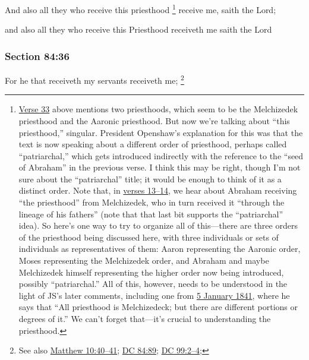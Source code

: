 		And also all they who receive this priesthood%
			\footnote{%
				\hyperref[DC84-33]{Verse 33} above mentions two priesthoods, which seem to be the Melchizedek priesthood and the Aaronic priesthood. But now we're talking about ``this priesthood,'' singular. President Openshaw's explanation for this was that the text is now speaking about a different order of priesthood, perhaps called ``patriarchal,'' which gets introduced indirectly with the reference to the ``seed of Abraham'' in the previous verse. I think this may be right, though I'm not sure about the ``patriarchal'' title; it would be enough to think of it as a distinct order. Note that, in \hyperref[DC84-13]{verses 13--14}, we hear about Abraham receiving ``the priesthood'' from Melchizedek, who in turn received it ``through the lineage of his fathers'' (note that that last bit supports the ``patriarchal'' idea). So here's one way to try to organize all of this---there are three orders of the priesthood being discussed here, with three individuals or sets of individuals as representatives of them: Aaron representing the Aaronic order, Moses representing the Melchizedek order, and Abraham and maybe Melchizedek himself representing the higher order now being introduced, possibly ``patriarchal.'' All of this, however, needs to be understood in the light of JS's later comments, including one from \hyperref[EMS-1841-JS-5-JAN-1841-WC]{5 January 1841}, where he says that ``All priesthood is Melchizedeck; but there are different portions or degrees of it.'' We can't forget that---it's crucial to understanding the priesthood.
				}
		receive me, saith the Lord;

		\begin{framed}
		\scriptsize
			\begin{compactdesc}
				\item[JSP] and also all they who receive this Priesthood receiveth me saith the Lord
			\end{compactdesc}
		\end{framed}

	\subsubsection{Section 84:36} %
		\label{DC84-36}

		For he that receiveth my servants receiveth me;%
			\footnote{%
				See also \hyperref[MATTHEW-10-40]{Matthew 10:40--41}; \hyperref[DC84-89]{DC 84:89}; \hyperref[DC99-2]{DC 99:2--4}; 
				}

